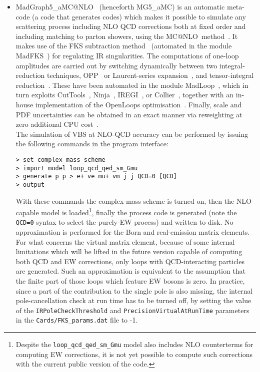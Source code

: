 \begin{itemize}
  \item {\sc MadGraph5\_aMC@NLO}~\cite{Alwall:2014hca} (henceforth {\sc MG5\_aMC}) is an automatic meta-code (a code that generates codes) which makes it possible to simulate any scattering process
      including NLO QCD corrections both at fixed order and including matching to parton showers, using the {\sc MC@NLO}\ method~\cite{Frixione:2002ik}. It makes use of the FKS subtraction method~\cite{Frixione:1995ms,
        Frixione:1997np} (automated in the module {\sc MadFKS}~\cite{Frederix:2009yq,
        Frederix:2016rdc}) for regulating IR singularities. The computations of one-loop amplitudes are carried out by switching dynamically between
        two integral-reduction techniques, OPP~\cite{Ossola:2006us} or Laurent-series expansion~\cite{Mastrolia:2012bu},
        and tensor-integral reduction~\cite{Passarino:1978jh,Davydychev:1991va,Denner:2005nn}. These have been automated in the module {\sc MadLoop}~\cite{Hirschi:2011pa}, which
        in turn exploits {\sc CutTools}~\cite{Ossola:2007ax}, {\sc Ninja}~\cite{Peraro:2014cba,
        Hirschi:2016mdz}, {\sc IREGI}~\cite{ShaoIREGI}, or {\sc Collier}~\cite{Denner:2016kdg}, together with an in-house 
        implementation of the {\sc OpenLoops} optimisation~\cite{Cascioli:2011va}. Finally, scale and PDF uncertainties can be obtained in an exact manner via reweighting
        at zero additional CPU cost~\cite{Frederix:2011ss}.\\
        The simulation of VBS at NLO-QCD accuracy can be performed by issuing the following commands in the program interface:
\begin{verbatim}
> set complex_mass_scheme
> import model loop_qcd_qed_sm_Gmu
> generate p p > e+ ve mu+ vm j j QCD=0 [QCD]
> output
\end{verbatim}
  With these commands the complex-mass scheme is turned on, then the NLO-capable model is loaded\footnote{Despite
            the {\tt loop\_qcd\_qed\_sm\_Gmu} model also includes NLO counterterms for computing EW corrections, it is not yet possible to compute such corrections
        with the current public version of the code.}, finally the process code is generated (note the {\tt QCD=0} syntax to select the purely-EW process)
        and written to disk. No approximation is performed for the Born and real-emission matrix elements. 
        For what concerns the virtual matrix element, because of some internal limitations which will be lifted in the future version capable of computing both QCD and EW corrections,
        only loops with QCD-interacting particles are generated. Such an approximation is equivalent to the assumption that the finite part of
        those loops which feature EW bosons is zero. In practice, since a part of the contribution to the single pole is also missing, the internal 
        pole-cancellation check at run time has to be turned off, by setting the value of the {\tt IR\-Pole\-Check\-Threshold} and 
        {\tt Precision\-Virtual\-At\-Run\-Time} parameters in the {\tt Cards\-/FKS\_\-params.dat} file to -1.


\end{itemize}

